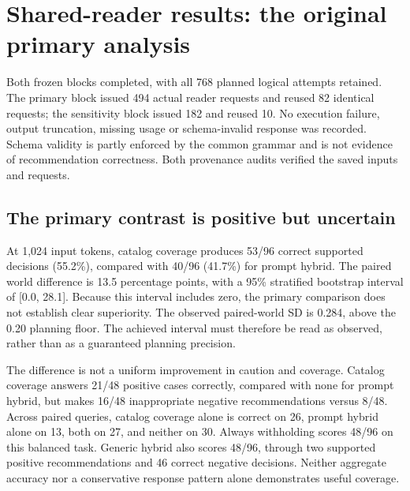 \section{Shared-reader results: the original primary analysis}
\label{sec:results}
Both frozen blocks completed, with all 768 planned logical attempts retained. The primary block issued 494 actual reader requests and reused 82 identical requests; the sensitivity block issued 182 and reused 10. No execution failure, output truncation, missing usage or schema-invalid response was recorded. Schema validity is partly enforced by the common grammar and is not evidence of recommendation correctness. Both provenance audits verified the saved inputs and requests.

\subsection{The primary contrast is positive but uncertain}
At 1,024 input tokens, catalog coverage produces 53/96 correct supported decisions (55.2\%), compared with 40/96 (41.7\%) for prompt hybrid. The paired world difference is 13.5 percentage points, with a 95\% stratified bootstrap interval of [0.0, 28.1]. Because this interval includes zero, the primary comparison does not establish clear superiority. The observed paired-world SD is 0.284, above the 0.20 planning floor. The achieved interval must therefore be read as observed, rather than as a guaranteed planning precision.

\begin{table}[htbp]
\centering\small

\caption{Primary results. Decision is correct supported decisions over all 96 queries; Positive is supported recommendations over 48 answerable queries; Neg.\ rec. is inappropriate recommendations over 48 negative queries. Tokens are mean input tokens per planned query; Gen.\ sec. is median generation-request elapsed time, charging the origin call for reused requests. Full context has its separate larger allowance.}
\label{tab:primary}
\end{table}

The difference is not a uniform improvement in caution and coverage. Catalog coverage answers 21/48 positive cases correctly, compared with none for prompt hybrid, but makes 16/48 inappropriate negative recommendations versus 8/48. Across paired queries, catalog coverage alone is correct on 26, prompt hybrid alone on 13, both on 27, and neither on 30. Always withholding scores 48/96 on this balanced task. Generic hybrid also scores 48/96, through two supported positive recommendations and 46 correct negative decisions. Neither aggregate accuracy nor a conservative response pattern alone demonstrates useful coverage.

